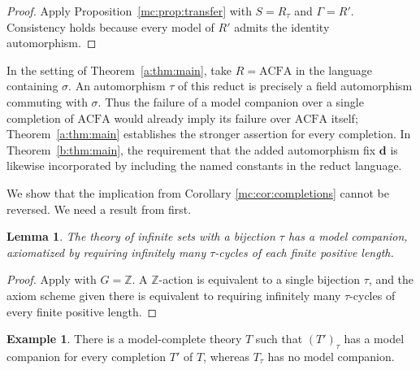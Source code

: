 \documentclass[11pt,a4paper]{amsart}
\newtheorem{lemma}[theorem]{Lemma}
\theoremstyle{definition}
\newtheorem{example}[theorem]{Example}
\newcommand{\Z}{\mathbb Z}
\newcommand{\bd}{\boldsymbol d}
\newcommand{\ACFA}{\mathrm{ACFA}}
\begin{document}
\begin{proof}
Apply Proposition~\ref{mc:prop:transfer} with $S=R_\tau$ and
$\Gamma=R'$. Consistency holds because every model of $R'$ admits
the identity automorphism.
\end{proof}

In the setting of Theorem~\ref{a:thm:main}, take $R=\ACFA$ in
the language containing $\sigma$. An automorphism $\tau$ of this
reduct is precisely a field automorphism commuting with $\sigma$.
Thus the failure of a model companion over a single completion of
$\ACFA$ would already imply its failure over $\ACFA$ itself;
Theorem~\ref{a:thm:main} establishes the stronger assertion for
every completion. In Theorem~\ref{b:thm:main}, the requirement that
the added automorphism fix $\bd$ is likewise incorporated by
including the named constants in the reduct language.

We show that the implication from Corollary \ref{mc:cor:completions} cannot be reversed. We need a result from \cite{HoffmannDynamics} first.
\begin{lemma}\label{mc:lem:permutations}
The theory of infinite sets with a bijection $\tau$ has a model
companion, axiomatized by requiring infinitely many $\tau$-cycles
of each finite positive length.
\end{lemma}

\begin{proof}
Apply \cite[Example~2.8]{HoffmannDynamics} with $G=\Z$.
A $\Z$-action is equivalent to a single bijection $\tau$,
and the axiom scheme given there is equivalent to requiring
infinitely many $\tau$-cycles of every finite positive length.
\end{proof}

\begin{example}\label{mc:ex:automorphisms}
There is a model-complete theory $T$ 
such that $(T')_\tau$ has a model companion for every completion
$T'$ of $T$, whereas $T_\tau$ has no model companion.
\end{example}
\end{document}
